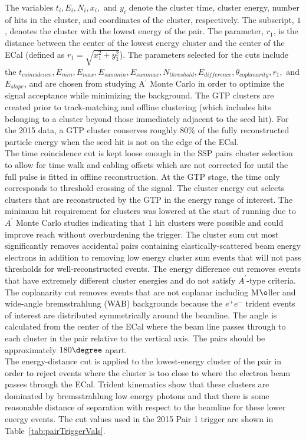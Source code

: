 The variables $t_i,E_i, N_i, x_i,$ and $y_i$ denote the cluster time, cluster energy, number of hits in the cluster, and coordinates of the cluster, respectively. The subscript, $1$, denotes the cluster with the lowest energy of the pair.  The parameter, $r_1$, is the distance between the center of the lowest energy cluster and the center of the ECal (defined as $r_1=\sqrt{x_1^2+y_1^2}$). The parameters selected for the cuts include the $t_{coincidence}, E_{min}, E_{max}, E_{sum min}, E_{sum max}, N_{threshold}, E_{difference}, \theta_{coplanarity}, r_{1},$ and $E_{slope}$, and are chosen from studying A$^{\prime}$ Monte Carlo in order to optimize the signal acceptance while minimizing the background. The GTP clusters are created prior to track-matching and offline clustering (which includes hits belonging to a cluster beyond those immediately adjacent to the seed hit). For the 2015 data, a GTP cluster conserves roughly 80$\%$ of the fully reconstructed particle energy when the seed hit is not on the edge of the ECal. \\
\indent The time coincidence cut is kept loose enough in the SSP pairs cluster selection to allow for time walk and cabling offsets which are not corrected for until the full pulse is fitted in offline reconstruction. At the GTP stage, the time only corresponds to threshold crossing of the signal. The cluster energy cut selects clusters that are reconstructed by the GTP in the energy range of interest. The minimum hit requirement for clusters was lowered at the start of running due to $A^{\prime}$ Monte Carlo studies indicating that 1 hit clusters were possible and could improve reach without overburdening the trigger. The cluster sum cut most significantly removes accidental pairs containing elastically-scattered beam energy electrons in addition to removing low energy cluster sum events that will not pass thresholds for well-reconstructed events. The energy difference cut removes events that have extremely different cluster energies and do not satisfy $A^{\prime}$-type criteria. \\
\indent The coplanarity cut removes events that are not coplanar including M$\o$ller and wide-angle bremsstrahlung (WAB) backgrounds because the $e^+e^-$ trident events of interest are distributed symmetrically around the beamline. The angle is calculated from the center of the ECal where the beam line passes through to each cluster in the pair relative to the vertical axis. The pairs should be approximately $180\degree$ apart. \\
\indent The energy-distance cut is applied to the lowest-energy cluster of the pair in order to reject events where the cluster is too close to where the electron beam passes through the ECal. Trident kinematics show that these clusters are dominated by bremsstrahlung low energy photons and that there is some reasonable distance of separation with respect to the beamline for these lower energy events. The cut values used in the 2015 Pair 1 trigger are shown in Table~\ref{tab:pairTriggerVals}.\\
